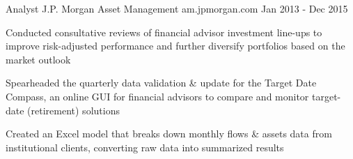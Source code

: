 \begin{cventries}
  \cventry
    {Analyst} %
    {J.P. Morgan Asset Management} %
    {am.jpmorgan.com} %
    {Jan 2013 - Dec 2015} %
    {
      \begin{cvitems} %
        \item {Conducted consultative reviews of financial advisor investment line-ups to improve risk-adjusted performance and further diversify portfolios based on the market outlook}
        \item {Spearheaded the quarterly data validation \& update for the Target Date Compass, an online GUI for financial advisors to compare and monitor target-date (retirement) solutions}
        \item {Created an Excel model that breaks down monthly flows \& assets data from institutional clients, converting raw data into summarized results}
      \end{cvitems}
    }

\end{cventries}